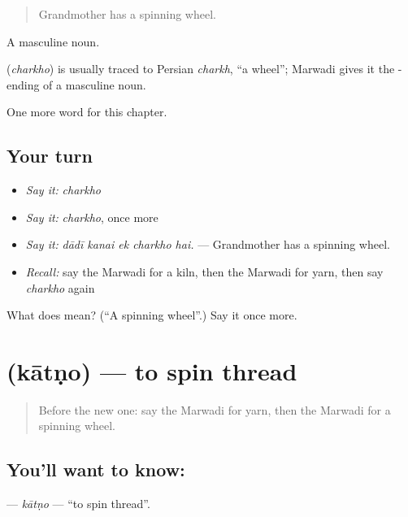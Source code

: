 \begin{quote}
Grandmother has a spinning wheel.
\end{quote}

A masculine noun.

\begin{cousinweb}
\textbf{} (\emph{charkho}) is usually traced to Persian \emph{charkh}, \textquotedblleft{}a wheel\textquotedblright{}; Marwadi gives it the - ending of a masculine noun.
\end{cousinweb}

\begin{grammarlens}[title={What you've built}]
One more word for this chapter.
\end{grammarlens}

\subsection*{Your turn}
\begin{itemize}
\raggedright
  \item \emph{Say it:} \emph{charkho}
  \item \emph{Say it:} \emph{charkho}, once more
  \item \emph{Say it:} \emph{dādī kanai ek charkho hai.} — Grandmother has a spinning wheel.
  \item \emph{Recall:} say the Marwadi for a kiln, then the Marwadi for yarn, then say \emph{charkho} again
\end{itemize}

\begin{tcolorbox}[breakable,colback=teal!4,colframe=teal!35!black,title={Before you move on}]
What does  mean? (\textquotedblleft{}A spinning wheel\textquotedblright{}.) Say it once more.
\end{tcolorbox}
\section[\texorpdfstring{\mw{कातणो} (kātṇo)}{कातणो (kātṇo)}]{ (kātṇo) — to spin thread}

\label{lesson:MW-C282-kaatno}



\begin{quote}
Before the new one: say the Marwadi for yarn, then the Marwadi for a spinning wheel.
\end{quote}

\subsection*{You'll want to know: }
\textbf{} — \emph{kātṇo} — \textquotedblleft{}to spin thread\textquotedblright{}.

